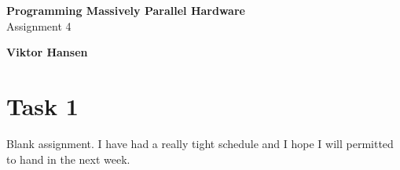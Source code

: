 \documentclass[11pt,a4paper,english]{article}
\begin{document}
\thispagestyle{empty} %
\hspace{6cm} \vspace{6cm}
\begin{center}
\textbf{\Huge {Programming Massively Parallel Hardware}}\\ \vspace{0.5cm}
\Large{Assignment 4}
\end{center}
\vspace{3cm}
\begin{center}
\Large{\textbf{Viktor Hansen}}
\end{center}
\vspace{6.0cm}
\thispagestyle{empty}

\newpage

\section*{Task 1}
Blank assignment. I have had a really tight schedule and I hope I will permitted to hand in the next week.



%
%



\end{document}
